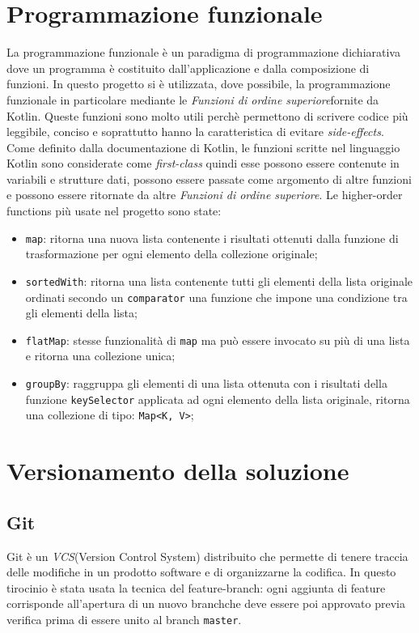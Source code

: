 \section{Programmazione funzionale}
La programmazione funzionale è un paradigma di programmazione dichiarativa dove un programma è costituito dall'applicazione e dalla composizione di funzioni. In questo progetto si è utilizzata, dove possibile, la programmazione funzionale in particolare mediante le \emph{Funzioni di ordine superiore}\glo fornite da Kotlin. Queste funzioni sono molto utili perchè permettono di scrivere codice più leggibile, conciso e soprattutto hanno la caratteristica di evitare \emph{side-effects}\glo. Come definito dalla documentazione di Kotlin, le funzioni scritte nel linguaggio Kotlin sono considerate come \emph{first-class} quindi esse possono essere contenute in variabili e strutture dati, possono essere passate come argomento di altre funzioni e possono essere ritornate da altre \emph{Funzioni di ordine superiore}. Le higher-order functions più usate nel progetto sono state:
\begin{itemize}
	\item \verb|map|: ritorna una nuova lista contenente i risultati ottenuti dalla funzione di trasformazione per ogni elemento della collezione originale;
	\item \verb|sortedWith|: ritorna una lista contenente tutti gli elementi della lista originale ordinati secondo un \verb|comparator| una funzione che impone una condizione tra gli elementi della lista;
	\item \verb|flatMap|: stesse funzionalità di \verb|map| ma può essere invocato su più di una lista e ritorna una collezione unica;
	\item \verb|groupBy|: raggruppa gli elementi di una lista ottenuta con i risultati della funzione \verb|keySelector| applicata ad ogni elemento della lista originale, ritorna una collezione di tipo: \verb|Map<K, V>|;
\end{itemize}

\section{Versionamento della soluzione}
\subsection{Git}
Git è un \emph{VCS}\glosp (Version Control System) distribuito che permette di tenere traccia delle modifiche in un prodotto software e di organizzarne la codifica. In questo tirocinio è stata usata la tecnica del feature-branch: ogni aggiunta di feature corrisponde all'apertura di un nuovo branch\glosp che deve essere poi approvato previa verifica prima di essere unito al branch \verb|master|.


